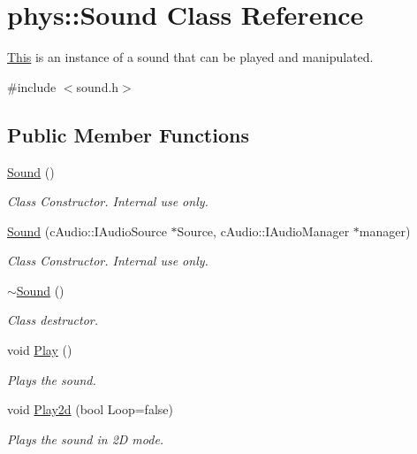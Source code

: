 \hypertarget{classphys_1_1Sound}{
\section{phys::Sound Class Reference}
\label{dc/d2f/classphys_1_1Sound}
}


\hyperlink{structThis}{This} is an instance of a sound that can be played and manipulated.  




{\ttfamily \#include $<$sound.h$>$}

\subsection*{Public Member Functions}
\begin{DoxyCompactItemize}
\item 
\hyperlink{classphys_1_1Sound_a6a9d4b475da9453c9b02ca2c49a6fa76}{Sound} ()
\begin{DoxyCompactList}\small\item\em Class Constructor. Internal use only. \item\end{DoxyCompactList}\item 
\hyperlink{classphys_1_1Sound_a0452d6079bcb201f9d2f3b2742eb21b6}{Sound} (cAudio::IAudioSource $\ast$Source, cAudio::IAudioManager $\ast$manager)
\begin{DoxyCompactList}\small\item\em Class Constructor. Internal use only. \item\end{DoxyCompactList}\item 
\hyperlink{classphys_1_1Sound_ad49df56479e003d0990a5dcb1c506d39}{$\sim$Sound} ()
\begin{DoxyCompactList}\small\item\em Class destructor. \item\end{DoxyCompactList}\item 
void \hyperlink{classphys_1_1Sound_ae7caa90deb9e5a4cab2d5ada27f5e5b5}{Play} ()
\begin{DoxyCompactList}\small\item\em Plays the sound. \item\end{DoxyCompactList}\item 
void \hyperlink{classphys_1_1Sound_a853bb9a2c1b41cd82a385608614861e7}{Play2d} (bool Loop=false)
\begin{DoxyCompactList}\small\item\em Plays the sound in 2D mode. \item\end{DoxyCompactList}\item 

\end{DoxyCompactItemize}
